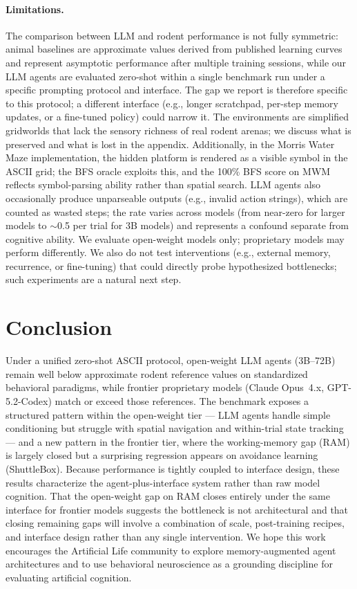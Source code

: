 \documentclass[letterpaper]{article}
\begin{document}
\paragraph{Limitations.}
The comparison between LLM and rodent performance is not fully symmetric: animal baselines are approximate values derived from published learning curves and represent asymptotic performance after multiple training sessions, while our LLM agents are evaluated zero-shot within a single benchmark run under a specific prompting protocol and interface.
The gap we report is therefore specific to this protocol; a different interface (e.g., longer scratchpad, per-step memory updates, or a fine-tuned policy) could narrow it.
The environments are simplified gridworlds that lack the sensory richness of real rodent arenas; we discuss what is preserved and what is lost in the \emph{} appendix.
Additionally, in the Morris Water Maze implementation, the hidden platform is rendered as a visible symbol in the ASCII grid; the BFS oracle exploits this, and the 100\% BFS score on MWM reflects symbol-parsing ability rather than spatial search.
LLM agents also occasionally produce unparseable outputs (e.g., invalid action strings), which are counted as wasted steps; the rate varies across models (from near-zero for larger models to $\sim$0.5 per trial for 3B models) and represents a confound separate from cognitive ability.
We evaluate open-weight models only; proprietary models may perform differently.
We also do not test interventions (e.g., external memory, recurrence, or fine-tuning) that could directly probe hypothesized bottlenecks; such experiments are a natural next step.


\section{Conclusion}

Under a unified zero-shot ASCII protocol, open-weight LLM agents (3B--72B) remain well below approximate rodent reference values on standardized behavioral paradigms, while frontier proprietary models (Claude Opus~4.x, GPT-5.2-Codex) match or exceed those references.
The benchmark exposes a structured pattern within the open-weight tier --- LLM agents handle simple conditioning but struggle with spatial navigation and within-trial state tracking --- and a new pattern in the frontier tier, where the working-memory gap (RAM) is largely closed but a surprising regression appears on avoidance learning (ShuttleBox).
Because performance is tightly coupled to interface design, these results characterize the agent-plus-interface system rather than raw model cognition.
That the open-weight gap on RAM closes entirely under the same interface for frontier models suggests the bottleneck is not architectural and that closing remaining gaps will involve a combination of scale, post-training recipes, and interface design rather than any single intervention.
We hope this work encourages the Artificial Life community to explore memory-augmented agent architectures and to use behavioral neuroscience as a grounding discipline for evaluating artificial cognition.
\end{document}
